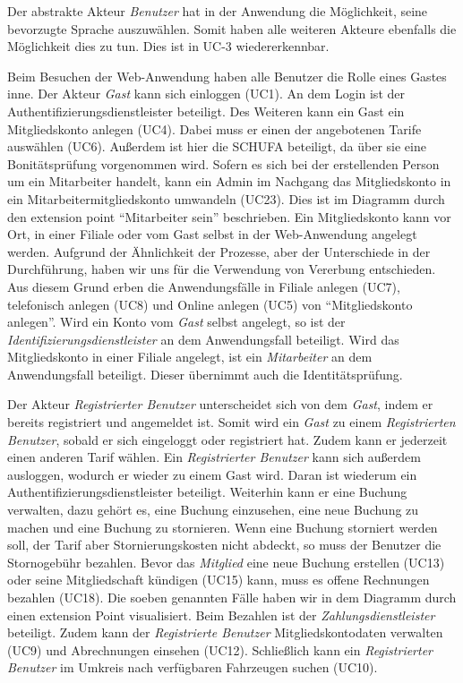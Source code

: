Der abstrakte Akteur \emph{Benutzer} hat in der Anwendung die Möglichkeit, seine bevorzugte Sprache auszuwählen.
Somit haben alle weiteren Akteure ebenfalls die Möglichkeit dies zu tun.
Dies ist in UC-3 wiedererkennbar. \medskip

Beim Besuchen der Web-Anwendung haben alle Benutzer die Rolle eines Gastes inne.
Der Akteur \emph{Gast} kann sich einloggen (UC1).
An dem Login ist der Authentifizierungsdienstleister beteiligt.
Des Weiteren kann ein Gast ein Mitgliedskonto anlegen (UC4).
Dabei muss er einen der angebotenen Tarife auswählen (UC6).
Außerdem ist hier die SCHUFA beteiligt, da über sie eine Bonitätsprüfung vorgenommen wird.
Sofern es sich bei der erstellenden Person um ein Mitarbeiter handelt, kann ein Admin im Nachgang das Mitgliedskonto
in ein Mitarbeitermitgliedskonto umwandeln (UC23).
Dies ist im Diagramm durch den extension point \enquote{Mitarbeiter sein} beschrieben.
Ein Mitgliedskonto kann vor Ort, in einer Filiale oder vom Gast selbst in der Web-Anwendung angelegt werden.
Aufgrund der Ähnlichkeit der Prozesse, aber der Unterschiede in der Durchführung, haben wir uns für die Verwendung von Vererbung entschieden.
Aus diesem Grund erben die Anwendungsfälle in Filiale anlegen (UC7), telefonisch anlegen (UC8) und Online anlegen (UC5) von \enquote{Mitgliedskonto anlegen}.
Wird ein Konto vom \emph{Gast} selbst angelegt, so ist der \emph{Identifizierungsdienstleister} an dem Anwendungsfall beteiligt.
Wird das Mitgliedskonto in einer Filiale angelegt, ist ein \emph{Mitarbeiter} an dem Anwendungsfall beteiligt.
Dieser übernimmt auch die Identitätsprüfung. \medskip

Der Akteur \emph{Registrierter Benutzer} unterscheidet sich von dem \emph{Gast}, indem er bereits registriert und angemeldet ist.
Somit wird ein \emph{Gast} zu einem \emph{Registrierten Benutzer}, sobald er sich eingeloggt oder registriert hat.
Zudem kann er jederzeit einen anderen Tarif wählen.
Ein \emph{Registrierter Benutzer} kann sich außerdem ausloggen, wodurch er wieder zu einem Gast wird.
Daran ist wiederum ein Authentifizierungsdienstleister beteiligt.
Weiterhin kann er eine Buchung verwalten, dazu gehört es, eine Buchung einzusehen, eine neue Buchung zu machen
und eine Buchung zu stornieren.
Wenn eine Buchung storniert werden soll, der Tarif aber Stornierungskosten nicht abdeckt, so muss der Benutzer die
Stornogebühr bezahlen.
Bevor das \emph{Mitglied} eine neue Buchung erstellen (UC13) oder seine Mitgliedschaft kündigen (UC15) kann, muss es offene Rechnungen bezahlen (UC18).
Die soeben genannten Fälle haben wir in dem Diagramm durch einen extension Point visualisiert.
Beim Bezahlen ist der \emph{Zahlungsdienstleister} beteiligt.
Zudem kann der \emph{Registrierte Benutzer} Mitgliedskontodaten verwalten (UC9) und Abrechnungen einsehen (UC12).
Schließlich kann ein \emph{Registrierter Benutzer} im Umkreis nach verfügbaren Fahrzeugen suchen (UC10). \medskip

